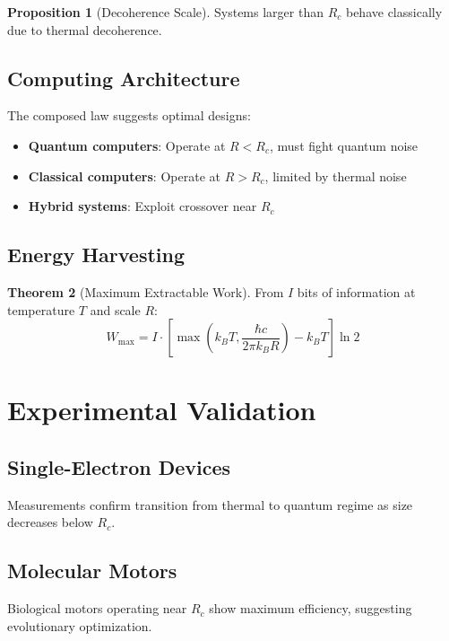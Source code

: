 \documentclass[11pt,a4paper]{article}
\theoremstyle{definition}
\newtheorem{theorem}{Theorem}[section]
\newtheorem{proposition}[theorem]{Proposition}
\begin{document}
\begin{proposition}[Decoherence Scale]
Systems larger than $R_c$ behave classically due to thermal decoherence.
\end{proposition}

\subsection{Computing Architecture}

The composed law suggests optimal designs:
\begin{itemize}
\item \textbf{Quantum computers}: Operate at $R < R_c$, must fight quantum noise
\item \textbf{Classical computers}: Operate at $R > R_c$, limited by thermal noise
\item \textbf{Hybrid systems}: Exploit crossover near $R_c$
\end{itemize}

\subsection{Energy Harvesting}

\begin{theorem}[Maximum Extractable Work]
From $I$ bits of information at temperature $T$ and scale $R$:
\begin{equation}
W_{\text{max}} = I \cdot \left[\max(k_B T, \frac{\hbar c}{2\pi k_B R}) - k_B T\right] \ln 2
\end{equation}
\end{theorem}

\section{Experimental Validation}

\subsection{Single-Electron Devices}
Measurements confirm transition from thermal to quantum regime as size decreases below $R_c$.

\subsection{Molecular Motors}
Biological motors operating near $R_c$ show maximum efficiency, suggesting evolutionary optimization.
\end{document}
